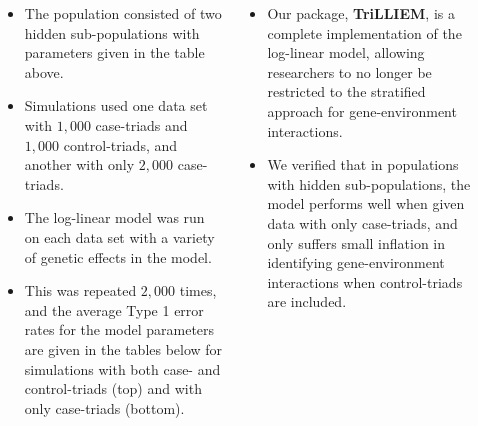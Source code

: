 \documentclass[25pt]{tikzposter}
\begin{document}
\begin{columns}
{\begin{minipage}{0.525\linewidth}
\begin{tikzfigure}
\vspace{0.5em}

\end{tikzfigure}
		\begin{itemize}
		\item The population consisted of two hidden sub-populations with parameters given in the table above.
		\item Simulations used one data set with $1,000$ case-triads and $1,000$ control-triads, and another with only $2,000$ case-triads.
		\item The log-linear model was run on each data set with a variety of genetic effects in the model.
		\item This was repeated $2,000$ times, and the average Type 1 error rates for the model parameters are given in the tables below for simulations with both case- and control-triads (top) and with only case-triads (bottom).
		\end{itemize}
	\end{minipage}
	\begin{minipage}{0.45\linewidth}


\vspace{0.4em}


\end{minipage}
	\vspace{-0.5em}
}

	{\LARGE
	\begin{itemize}
		\item Our package, \textbf{TriLLIEM}, is a complete implementation of the log-linear model, allowing researchers to no longer be restricted to the stratified approach for gene-environment interactions.
		\item We verified that in populations with hidden sub-populations, the model performs well when given data with only case-triads, and only suffers small inflation in identifying gene-environment interactions when control-triads are included.
	\end{itemize}
	\vspace{-0.5em}
}

\end{columns}
\end{document}

